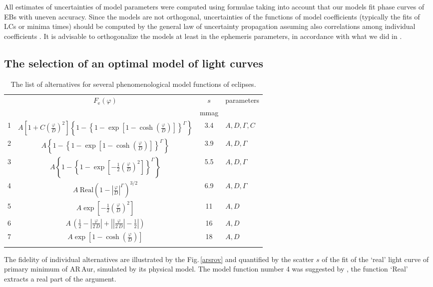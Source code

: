 \documentclass{aa}
\newcommand{\zav}[1]{\left(#1\right)}
\newcommand{\hzav}[1]{\left[#1\right]}
\begin{document}
All estimates of uncertainties of model parameters were computed using formulae taking into account that our models fit phase curves of EBs with uneven accuracy. Since the models are not orthogonal, uncertainties of the functions of model coefficients (typically the fits of LCs or minima times) should be computed by the general law of uncertainty propagation assuming also correlations among individual coefficients \citep[see e.g.][]{bevington,mikzej}. It is advisable to orthogonalize the models at least in the ephemeris parameters, in accordance with what we did in \citep[][]{mikort,mik901}.



\subsection{The selection of an optimal model of light curves }


\begin{table}[ht]
\caption{\small{The list of alternatives for several phenomenological model functions of eclipses.}}\label{srov}
\begin{center}\tiny
\begin{tabular}{lccl}
\hline \hline \rule{0pt}{1.07em}
&$F_{\mathrm{e}}(\varphi)$ & $s$ &parameters\\
&&mmag&\\
 \hline
1&$A\hzav{1\!+\!C\zav{\frac{\varphi}{D}}^2}\left\{1\!-\!\left\{1\!-\! \exp\hzav{1\!-\!\cosh\zav{\frac{\varphi}{D}}}\right\}^ {\mathit{\Gamma}}\right\}$&3.4 &$A,D,\mathit{\Gamma},C$\\
2&$A\left\{1\!-\!\left\{1\!-\!\exp\hzav{1\!-\!\cosh\zav{\frac{\varphi}{D}}}
\right\}^{\mathit{\Gamma}}\right\}$&3.9&$A,D,\mathit{\Gamma}$ \\
3&$A\left\{1\!-\!\left\{1\!-\!\exp\hzav{-\frac{1}{2}\zav{\frac{\varphi}{D}}^2}
\right\}^{\mathit{\Gamma}}\right\}$&5.5&$A,D,\mathit{\Gamma}$\\
4&$A\ \mathrm{Real}\zav{1\!-\!\left |\frac{\varphi}{D}\right |^\mathit{\Gamma}}^{3/2}$&6.9 &$A,D,\mathit{\Gamma}$\\
5&$A\exp\hzav{-\frac{1}{2}\zav{\frac{\varphi}{D}}^2}$&11&$A,D$ \\
6&$A\,\zav{\frac{1}{2}\!-\!\left|\frac{\varphi}{2\,D}\right|+\left|\left| \frac{\varphi}{2\,D}\right|\!-\!\frac{1}{2}\right|}$&16&$A,D$ \\
7&$A\exp\hzav{1\!-\!\cosh\zav{\frac{\varphi}{D}}}$&18&$A,D$ \\
\hline\\
\end{tabular}
\end{center}
\label{table}
\tiny{The fidelity of individual alternatives are illustrated by the Fig.\,\ref{arsrov} and quantified by the scatter $s$  of the fit of the `real' light curve of primary minimum of AR\,Aur, simulated by its physical model. The model function number 4 was suggested by \citet{and10,and12}, the function `Real' extracts a real part of the argument.}
\end{table}
\end{document}
